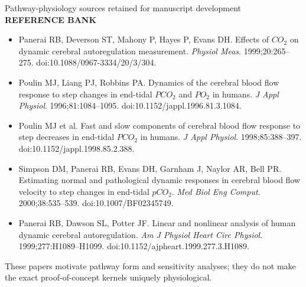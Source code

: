 \documentclass[aspectratio=169,11pt]{beamer}
\newcommand{\sectionlabel}[1]{%
  {\color{Accent}\fontsize{8}{9.5}\selectfont\bfseries\MakeUppercase{#1}}\par\vspace{0.12cm}}
\begin{document}
\begin{frame}{Pathway-physiology sources retained for manuscript development}
\sectionlabel{Reference Bank}
\fontsize{8.6}{10.8}\selectfont
\begin{itemize}
  \item Panerai RB, Deverson ST, Mahony P, Hayes P, Evans DH. Effects of $CO_2$ on dynamic cerebral autoregulation measurement. \emph{Physiol Meas}. 1999;20:265--275. doi:10.1088/0967-3334/20/3/304.
  \item Poulin MJ, Liang PJ, Robbins PA. Dynamics of the cerebral blood flow response to step changes in end-tidal $PCO_2$ and $PO_2$ in humans. \emph{J Appl Physiol}. 1996;81:1084--1095. doi:10.1152/jappl.1996.81.3.1084.
  \item Poulin MJ et al. Fast and slow components of cerebral blood flow response to step decreases in end-tidal $PCO_2$ in humans. \emph{J Appl Physiol}. 1998;85:388--397. doi:10.1152/jappl.1998.85.2.388.
  \item Simpson DM, Panerai RB, Evans DH, Garnham J, Naylor AR, Bell PR. Estimating normal and pathological dynamic responses in cerebral blood flow velocity to step changes in end-tidal $pCO_2$. \emph{Med Biol Eng Comput}. 2000;38:535--539. doi:10.1007/BF02345749.
  \item Panerai RB, Dawson SL, Potter JF. Linear and nonlinear analysis of human dynamic cerebral autoregulation. \emph{Am J Physiol Heart Circ Physiol}. 1999;277:H1089--H1099. doi:10.1152/ajpheart.1999.277.3.H1089.
\end{itemize}

\vspace{0.08cm}
These papers motivate pathway form and sensitivity analyses; they do not make
the exact proof-of-concept kernels uniquely physiological.
\end{frame}
\end{document}

